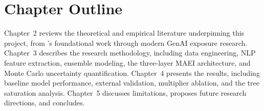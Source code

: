 \section{Chapter Outline}
\label{sec:intro-outline}

Chapter~2 reviews the theoretical and empirical literature underpinning this
project, from \citet{Frey_Osborne_2017}'s foundational work through modern
GenAI exposure research.  Chapter~3 describes the research methodology,
including data engineering, NLP feature extraction, ensemble modeling, the
three-layer MAEI architecture, and Monte Carlo uncertainty quantification.
Chapter~4 presents the results, including baseline model performance,
external validation, multiplier ablation, and the tree saturation analysis.
Chapter~5 discusses limitations, proposes future research directions, and
concludes.
